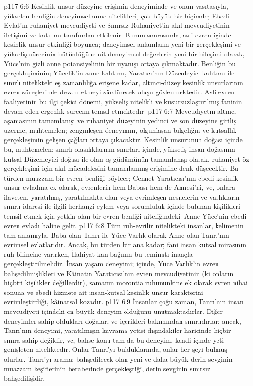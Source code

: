 \vs p117 6:6 Kesinlik unsur düzeyine erişimin deneyiminde ve onun vasıtasıyla, yükselen benliğin deneyimsel anne nitelikleri, çok büyük bir biçimde; Ebedi Evlat’ın ruhaniyet mevcudiyeti ve Sınırsız Ruhaniyet’in akıl mevcudiyetinin iletişimi ve katılımı tarafından etkilenir. Bunun sonrasında, asli evren içinde kesinlik unsur etkinliği boyunca; deneyimsel anlamların yeni bir gerçekleşimi ve yükseliş sürecinin bütünlüğüne ait deneyimsel değerlerin yeni bir bileşimi olarak, Yüce’nin gizli anne potansiyelinin bir uyanışı ortaya çıkmaktadır. Benliğin bu gerçekleşiminin; Yücelik’in anne kalıtımı, Yaratıcı’nın Düzenleyici kalıtımı ile sınırlı nitelikteki eş zamanlılığa erişene kadar, altıncı\hyp{}düzey kesinlik unsurlarının evren süreçlerinde devam etmeyi sürdürecek oluşu gözlenmektedir. Asli evren faaliyetinin bu ilgi çekici dönemi, yükseliş nitelikli ve kusursuzlaştırılmış faninin devam eden ergenlik sürecini temsil etmektedir.
\vs p117 6:7 Mevcudiyetin altıncı aşamasının tamamlanışı ve ruhaniyet düzeyinin yedinci ve son düzeyine giriliş üzerine, muhtemelen; zenginleşen deneyimin, olgunlaşan bilgeliğin ve kutsallık gerçekleşimin gelişen çağları ortaya çıkacaktır. Kesinlik unsurunun doğası içinde bu, muhtemelen; sınırlı olasılıklarının sınırları içinde, yükseliş insan\hyp{}doğasının kutsal Düzenleyici\hyp{}doğası ile olan eş\hyp{}güdümünün tamamlanışı olarak, ruhaniyet öz gerçekleşimi için akıl mücadelesini tamamlanmış erişimine denk düşecektir. Bu türden muazzam bir evren benliği böylece; Cennet Yaratıcısı’nın ebedi kesinlik unsur evladına ek olarak, evrenlerin hem Babası hem de Annesi’ni, ve, onlara ilaveten, yaratılmış, yaratılmakta olan veya evrimleşen nesnelerin ve varlıkların sınırlı idaresi ile ilgili herhangi eylem veya sorumluluk içinde bulunan kişilikleri temsil etmek için yetkin olan bir evren benliği niteliğindeki, Anne Yüce’nin ebedi evren evladı haline gelir.
\vs p117 6:8 Tüm ruh\hyp{}evrilir nitelikteki insanlar, kelimenin tam anlamıyla, Baba olan Tanrı ile Yüce Varlık olarak Anne olan Tanrı’nın evrimsel evlatlarıdır. Ancak, bu türden bir ana kadar; fani insan kutsal mirasının ruh\hyp{}bilincine varırken, İlahiyat kan bağının bu teminatı inançla gerçekleştirilmelidir. İnsan yaşam deneyimi; içinde, Yüce Varlık’ın evren bahşedilmişlikleri ve Kâinatın Yaratıcısı’nın evren mevcudiyetinin (ki onların hiçbiri kişilikler değillerdir), zamanın morontia ruhununkine ek olarak evren nihai sonuna ve ebedi hizmete ait insan\hyp{}kutsal kesinlik unsur karakterini evrimleştirdiği, kâinatsal kozadır.
\vs p117 6:9 İnsanlar çoğu zaman, Tanrı’nın insan mevcudiyeti içindeki en büyük deneyim olduğunu unutmaktadırlar. Diğer deneyimler sahip oldukları doğaları ve içerikleri bakımından sınırlıdırlar; ancak, Tanrı’nın deneyimi, yaratılmışın kavrama yetisi dışındakiler haricinde hiçbir sınıra sahip değildir, ve, bahse konu tam da bu deneyim, kendi içinde yeti genişleten niteliktedir. Onlar Tanrı’yı bulduklarında, onlar her şeyi bulmuş olurlar. Tanrı’yı arama; bahşedilecek olan yeni ve daha büyük derin sevginin muazzam keşiflerinin beraberinde gerçekleştiği, derin sevginin sınırsız bahşedilişidir.
